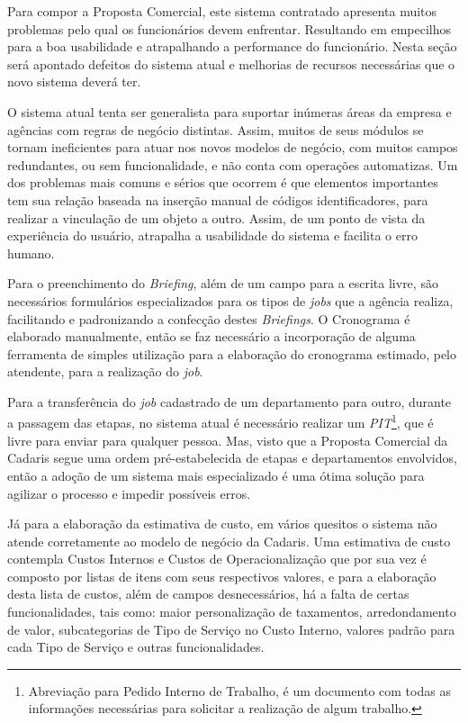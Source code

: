 \documentclass[
  12pt,				%
  openany,
  oneside,
  a4paper,			%
  english,			%
  brazil
]{article}
\numberwithin{figure}{section}
\numberwithin{table}{section}
\begin{document}
Para compor a Proposta Comercial, este sistema contratado apresenta muitos problemas pelo qual os funcionários devem enfrentar. Resultando em empecilhos para a boa usabilidade e atrapalhando a performance do funcionário. Nesta seção será apontado defeitos do sistema atual e melhorias de recursos necessárias que o novo sistema deverá ter.

O sistema atual tenta ser generalista para suportar inúmeras áreas da empresa e agências com regras de negócio distintas. Assim, muitos de seus módulos se tornam ineficientes para atuar nos novos modelos de negócio, com muitos campos redundantes, ou sem funcionalidade, e não conta com operações automatizas. Um dos problemas mais comuns e sérios que ocorrem é que elementos importantes tem sua relação baseada na inserção manual de códigos identificadores, para realizar a vinculação de um objeto a outro. Assim, de um ponto de vista da experiência do usuário, atrapalha a usabilidade do sistema e facilita o erro humano.

Para o preenchimento do \textit{Briefing}, além de um campo para a escrita livre, são necessários formulários especializados para os tipos de \textit{jobs} que a agência realiza, facilitando e padronizando a confecção destes \textit{Briefings}. O Cronograma é elaborado manualmente, então se faz necessário a incorporação de alguma ferramenta de simples utilização para a elaboração do cronograma estimado, pelo atendente, para a realização do \textit{job}.

Para a transferência do \textit{job} cadastrado de um departamento para outro, durante a passagem das etapas, no sistema atual é necessário realizar um \textit{PIT}\footnote{Abreviação para Pedido Interno de Trabalho, é um documento com todas as informações necessárias para solicitar a realização de algum trabalho.}, que é livre para enviar para qualquer pessoa. Mas, visto que a Proposta Comercial da Cadaris segue uma ordem pré-estabelecida de etapas e departamentos envolvidos, então a adoção de um sistema mais especializado é uma ótima solução para agilizar o processo e impedir possíveis erros.

Já para a elaboração da estimativa de custo, em vários quesitos o sistema não atende corretamente ao modelo de negócio da Cadaris. Uma estimativa de custo contempla Custos Internos e Custos de Operacionalização que por sua vez é composto por listas de itens com seus respectivos valores, e para a elaboração desta lista de custos, além de campos desnecessários, há a falta de certas funcionalidades, tais como: maior personalização de taxamentos, arredondamento de valor, subcategorias de Tipo de Serviço no Custo Interno, valores padrão para cada Tipo de Serviço e outras funcionalidades. 
\end{document}
